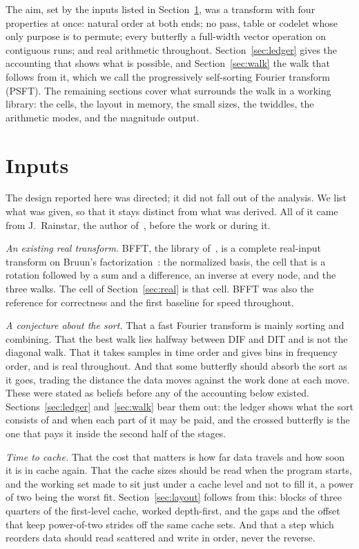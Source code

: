 \documentclass[conference]{IEEEtran}
\begin{document}
The aim, set by the inputs listed in Section~\ref{sec:inputs}, was a transform with four properties at once: natural order at both ends; no pass, table or codelet whose only purpose is to permute; every butterfly a full-width vector operation on contiguous runs; and real arithmetic throughout.
Section~\ref{sec:ledger} gives the accounting that shows what is possible, and Section~\ref{sec:walk} the walk that follows from it, which we call the progressively self-sorting Fourier transform (PSFT).
The remaining sections cover what surrounds the walk in a working library: the cells, the layout in memory, the small sizes, the twiddles, the arithmetic modes, and the magnitude output.

\section{Inputs}\label{sec:inputs}

The design reported here was directed; it did not fall out of the analysis.
We list what was given, so that it stays distinct from what was derived.
All of it came from J.~Rainstar, the author of~\cite{obr}, before the work or during it.

\emph{An existing real transform.}
BFFT, the library of~\cite{obr}, is a complete real-input transform on Bruun's factorization~\cite{bruun}: the normalized basis, the cell that is a rotation followed by a sum and a difference, an inverse at every node, and the three walks.
The cell of Section~\ref{sec:real} is that cell.
BFFT was also the reference for correctness and the first baseline for speed throughout.

\emph{A conjecture about the sort.}
That a fast Fourier transform is mainly sorting and combining.
That the best walk lies halfway between DIF and DIT and is not the diagonal walk.
That it takes samples in time order and gives bins in frequency order, and is real throughout.
And that some butterfly should absorb the sort as it goes, trading the distance the data moves against the work done at each move.
These were stated as beliefs before any of the accounting below existed.
Sections~\ref{sec:ledger} and~\ref{sec:walk} bear them out: the ledger shows what the sort consists of and when each part of it may be paid, and the crossed butterfly is the one that pays it inside the second half of the stages.

\emph{Time to cache.}
That the cost that matters is how far data travels and how soon it is in cache again.
That the cache sizes should be read when the program starts, and the working set made to sit just under a cache level and not to fill it, a power of two being the worst fit.
Section~\ref{sec:layout} follows from this: blocks of three quarters of the first-level cache, worked depth-first, and the gaps and the offset that keep power-of-two strides off the same cache sets.
And that a step which reorders data should read scattered and write in order, never the reverse.
\end{document}

